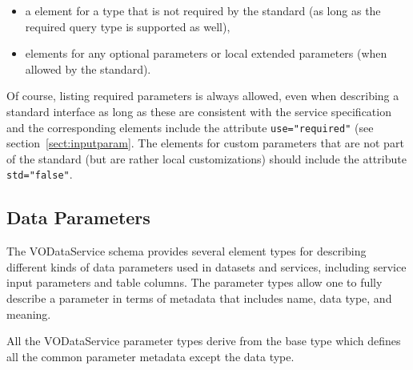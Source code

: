 \documentclass[11pt,a4paper]{ivoa}
\begin{document}
\begin{itemize}
\item a  element for a type that is not
  required by the standard (as long as the required query type is
  supported as well),

\item {}\/ elements for any optional parameters
       or local extended parameters (when allowed by the standard).
\end{itemize}


Of course, listing required parameters is always allowed, even when
describing a standard interface as long as these are consistent with
the service specification and the corresponding 
elements include the attribute \verb|use="required"| (see
section~\ref{sect:inputparam}.  The 
elements for custom parameters that are not part of the standard (but
are rather local customizations) should include the attribute
\verb|std="false"|.





\subsection{Data Parameters}
\label{sect:param}


The VODataService schema provides several element types for describing
different kinds of data parameters used in datasets and services,
including service input parameters and table columns.  The parameter
types allow one to fully describe a parameter in terms of metadata
that includes name, data type, and meaning.  


All the VODataService parameter types derive from the base type 
 which defines all the common parameter
metadata except the data type.  
\end{document}

